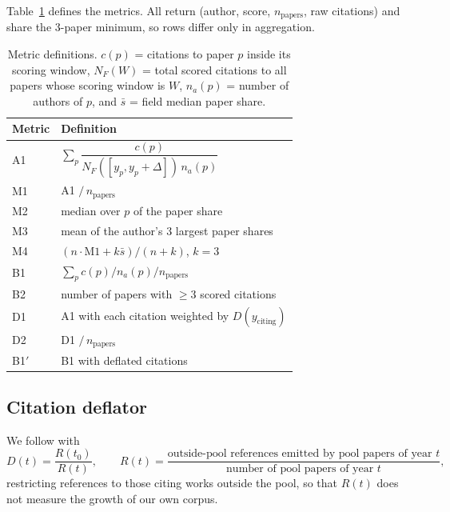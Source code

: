 \documentclass{article}
\begin{document}
Table~\ref{tab:defs} defines the metrics. All return (author, score, $n_{\text{papers}}$,
raw citations) and share the 3-paper minimum, so rows differ only in aggregation.

\begin{table}[h]
\caption{Metric definitions. $c(p)$ = citations to paper $p$ inside its scoring window,
  $N_F(W)$ = total scored citations to all papers whose scoring window is $W$,
  $n_a(p)$ = number of authors of $p$, and $\bar{s}$ = field median paper share.}
\label{tab:defs}
\centering
\small
\begin{tabular}{ll}
\toprule
\textbf{Metric} & \textbf{Definition} \\
\midrule
A1 & $\sum_p \dfrac{c(p)}{N_F([y_p, y_p+\Delta])\, n_a(p)}$ \\[8pt]
M1 & A1 $/\, n_{\text{papers}}$ \\[4pt]
M2 & median over $p$ of the paper share \\[4pt]
M3 & mean of the author's 3 largest paper shares \\[4pt]
M4 & $(n \cdot \text{M1} + k\bar{s})/(n + k)$, $k = 3$ \\[4pt]
B1 & $\sum_p c(p)/n_a(p) \big/ n_{\text{papers}}$ \\[4pt]
B2 & number of papers with $\geq 3$ scored citations \\
\midrule
D1 & A1 with each citation weighted by $D(y_{\text{citing}})$ \\
D2 & D1 $/\, n_{\text{papers}}$ \\
B1$'$ & B1 with deflated citations \\
\bottomrule
\end{tabular}
\end{table}

\subsection{Citation deflator}
\label{sec:deflator}

We follow \citet{petersen2019inflation} with
\begin{equation}
  D(t) = \frac{R(t_0)}{R(t)}, \qquad
  R(t) = \frac{\text{outside-pool references emitted by pool papers of year } t}
               {\text{number of pool papers of year } t},
\end{equation}
restricting references to those citing works outside the pool, so that $R(t)$ does not measure
the growth of our own corpus.
\end{document}
